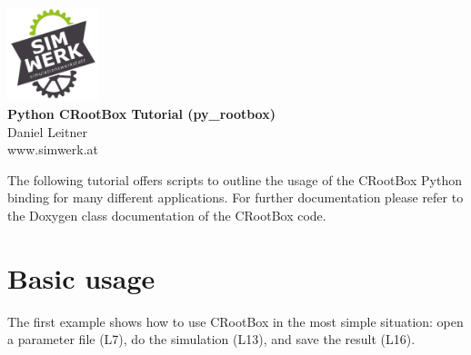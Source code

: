 \documentclass[a4paper]{article}
\begin{document}
\begin{center}
\includegraphics[width=0.2\textwidth]{sw_logo} \\
\vspace{0.5 cm}
\huge{\textbf{Python CRootBox Tutorial (py\_rootbox)}} \\
\vspace{0.5 cm}
\normalsize
Daniel Leitner \\
www.simwerk.at 
\end{center}

\vspace{0.5 cm}

\noindent 
The following tutorial offers scripts to outline the usage of the CRootBox Python binding for many different applications. 
For further documentation please refer to the Doxygen class documentation of the CRootBox code.


\vspace{0.5 cm}

\tableofcontents



\section{Basic usage}
 
The first example shows how to use CRootBox in the most simple situation: open a parameter file (L7), do the simulation (L13), and save the result (L16). 

\end{document}
